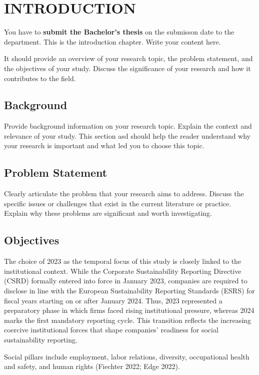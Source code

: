 \chapter{INTRODUCTION}

You have to \textbf{submit the Bachelor's thesis} on the submisson date to the department. This is the introduction chapter. Write your content here.

It should provide an overview of your research topic, the problem statement, and the objectives of your study. Discuss the significance of your research and how it contributes to the field.
\section{Background}
Provide background information on your research topic. Explain the context and relevance of your study. This section
asd should help the reader understand why your research is important and what led you to choose this topic.
\section{Problem Statement}
Clearly articulate the problem that your research aims to address. Discuss the specific issues or challenges that exist in the current literature or practice. Explain why these problems are significant and worth investigating.
\section{Objectives}
The choice of 2023 as the temporal focus of this study is closely linked to the institutional context. 
While the Corporate Sustainability Reporting Directive (CSRD) formally entered into force in January 2023, 
companies are required to disclose in line with the European Sustainability Reporting Standards (ESRS) for 
fiscal years starting on or after January 2024. Thus, 2023 represented a preparatory phase in which firms 
faced rising institutional pressure, whereas 2024 marks the first mandatory reporting cycle. 
This transition reflects the increasing coercive institutional forces that shape companies’ readiness 
for social sustainability reporting.

Social pillars include employment, labor relations, diversity,
occupational health and safety, and human rights (Fiechter 2022; Edge 2022).